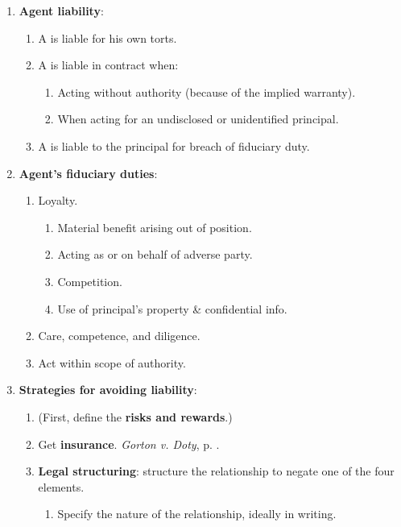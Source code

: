 \begin{enumerate}
\begin{enumerate}
\begin{enumerate}
        \end{enumerate}
    \end{enumerate}
    \item \textbf{Agent liability}:
    \begin{enumerate}
        \item A is liable for his own torts.
        \item A is liable in contract when:
        \begin{enumerate}
            \item Acting without authority (because of the implied warranty).
            \item When acting for an undisclosed or unidentified principal.
        \end{enumerate}
        \item A is liable to the principal for breach of fiduciary duty.
    \end{enumerate}
    \item \textbf{Agent's fiduciary duties}:
    \begin{enumerate}
        \item Loyalty.
        \begin{enumerate}
            \item Material benefit arising out of position.
            \item Acting as or on behalf of adverse party.
            \item Competition.
            \item Use of principal's property \& confidential info.
        \end{enumerate}
        \item Care, competence, and diligence.
        \item Act within scope of authority.
    \end{enumerate}
    \item \textbf{Strategies for avoiding liability}:
    \begin{enumerate}
        \item (First, define the \textbf{risks and rewards}.)
        \item Get \textbf{insurance}. \emph{Gorton v. Doty}, p.
        \pageref{subsub:gorton}.
        \item \textbf{Legal structuring}: structure the relationship to negate 
        one of the four elements.
        \begin{enumerate}
            \item Specify the nature of the relationship, ideally in writing.

\end{enumerate}
\end{enumerate}
\end{enumerate}
